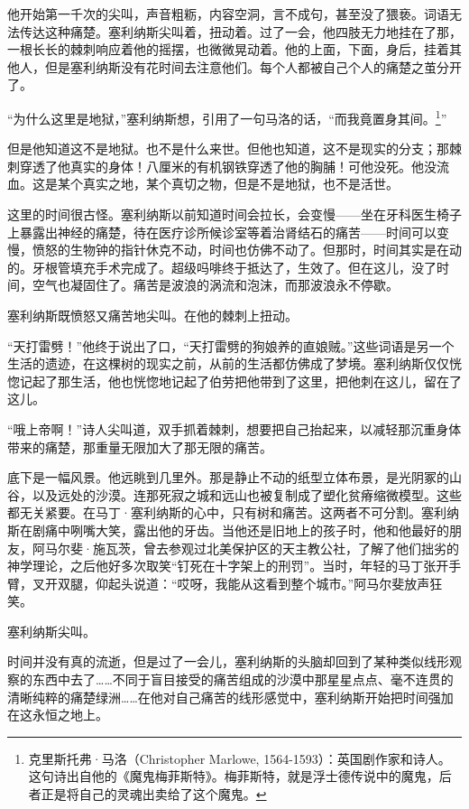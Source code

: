 \documentclass[AutoFakeBold=true]{book}
\begin{document}
他开始第一千次的尖叫，声音粗粝，内容空洞，言不成句，甚至没了猥亵。词语无法传达这种痛楚。塞利纳斯尖叫着，扭动着。过了一会，他四肢无力地挂在了那，一根长长的棘刺响应着他的摇摆，也微微晃动着。他的上面，下面，身后，挂着其他人，但是塞利纳斯没有花时间去注意他们。每个人都被自己个人的痛楚之茧分开了。

{\kaishu ``为什么这里是地狱，''}塞利纳斯想，引用了一句马洛的话，{\kaishu ``而我竟置身其间。\footnote{克里斯托弗·马洛（Christopher Marlowe, 1564-1593）：英国剧作家和诗人。这句诗出自他的《魔鬼梅菲斯特》。梅菲斯特，就是浮士德传说中的魔鬼，后者正是将自己的灵魂出卖给了这个魔鬼。}''}

但是他知道这不是地狱。也不是什么来世。但他也知道，这不是现实的分支；那棘刺穿透了他真实的身体！八厘米的有机钢铁穿透了他的胸脯！可他没死。他没流血。这是某个真实之地，某个真切之物，但是不是地狱，也不是活世。

这里的时间很古怪。塞利纳斯以前知道时间会拉长，会变慢——坐在牙科医生椅子上暴露出神经的痛楚，待在医疗诊所候诊室等着治肾结石的痛苦——时间可以变慢，愤怒的生物钟的指针休克不动，时间也仿佛不动了。但那时，时间其实是在动的。牙根管填充手术完成了。超级吗啡终于抵达了，生效了。但在这儿，没了时间，空气也凝固住了。痛苦是波浪的涡流和泡沫，而那波浪永不停歇。

塞利纳斯既愤怒又痛苦地尖叫。在他的棘刺上扭动。

``天打雷劈！''他终于说出了口，``天打雷劈的狗娘养的直娘贼。''这些词语是另一个生活的遗迹，在这棵树的现实之前，从前的生活都仿佛成了梦境。塞利纳斯仅仅恍惚记起了那生活，他也恍惚地记起了伯劳把他带到了这里，把他刺在这儿，留在了这儿。

``哦上帝啊！''诗人尖叫道，双手抓着棘刺，想要把自己抬起来，以减轻那沉重身体带来的痛楚，那重量无限加大了那无限的痛苦。

底下是一幅风景。他远眺到几里外。那是静止不动的纸型立体布景，是光阴冢的山谷，以及远处的沙漠。连那死寂之城和远山也被复制成了塑化贫瘠缩微模型。这些都无关紧要。在马丁·塞利纳斯的心中，只有树和痛苦。这两者不可分割。塞利纳斯在剧痛中咧嘴大笑，露出他的牙齿。当他还是旧地上的孩子时，他和他最好的朋友，阿马尔斐·施瓦茨，曾去参观过北美保护区的天主教公社，了解了他们拙劣的神学理论，之后他好多次取笑``钉死在十字架上的刑罚''。当时，年轻的马丁张开手臂，叉开双腿，仰起头说道：``哎呀，我能从这看到整个城市。''阿马尔斐放声狂笑。

塞利纳斯尖叫。

时间并没有真的流逝，但是过了一会儿，塞利纳斯的头脑却回到了某种类似线形观察的东西中去了……不同于盲目接受的痛苦组成的沙漠中那星星点点、毫不连贯的清晰纯粹的痛楚绿洲……在他对自己痛苦的线形感觉中，塞利纳斯开始把时间强加在这永恒之地上。
\end{document}
